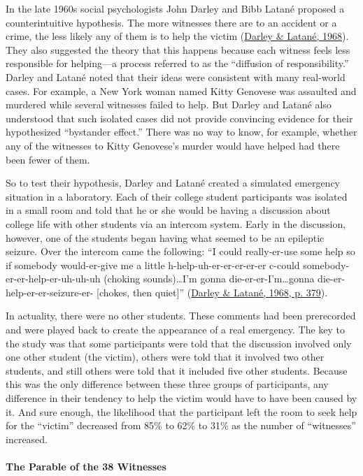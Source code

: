 \documentclass[
]{krantz}
\begin{document}
In the late 1960s social psychologists John Darley and Bibb Latané proposed a counterintuitive hypothesis. The more witnesses there are to an accident or a crime, the less likely any of them is to help the victim (\protect\hyperlink{ref-darley1968bystander}{Darley \& Latané, 1968}). They also suggested the theory that this happens because each witness feels less responsible for helping---a process referred to as the ``diffusion of responsibility.'' Darley and Latané noted that their ideas were consistent with many real-world cases. For example, a New York woman named Kitty Genovese was assaulted and murdered while several witnesses failed to help. But Darley and Latané also understood that such isolated cases did not provide convincing evidence for their hypothesized ``bystander effect.'' There was no way to know, for example, whether any of the witnesses to Kitty Genovese's murder would have helped had there been fewer of them.

So to test their hypothesis, Darley and Latané created a simulated emergency situation in a laboratory. Each of their college student participants was isolated in a small room and told that he or she would be having a discussion about college life with other students via an intercom system. Early in the discussion, however, one of the students began having what seemed to be an epileptic seizure. Over the intercom came the following: ``I could really-er-use some help so if somebody would-er-give me a little h-help-uh-er-er-er-er-er c-could somebody-er-er-help-er-uh-uh-uh (choking sounds)\ldots I'm gonna die-er-er-I'm\ldots gonna die-er-help-er-er-seizure-er- {[}chokes, then quiet{]}'' (\protect\hyperlink{ref-darley1968bystander}{Darley \& Latané, 1968, p. 379}).

In actuality, there were no other students. These comments had been prerecorded and were played back to create the appearance of a real emergency. The key to the study was that some participants were told that the discussion involved only one other student (the victim), others were told that it involved two other students, and still others were told that it included five other students. Because this was the only difference between these three groups of participants, any difference in their tendency to help the victim would have to have been caused by it. And sure enough, the likelihood that the participant left the room to seek help for the ``victim'' decreased from 85\% to 62\% to 31\% as the number of ``witnesses'' increased.

\hypertarget{the-parable-of-the-38-witnesses}{%
\paragraph*{The Parable of the 38 Witnesses}\label{the-parable-of-the-38-witnesses}}
\end{document}
